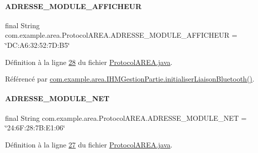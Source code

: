 \paragraph{\texorpdfstring{A\+D\+R\+E\+S\+S\+E\+\_\+\+M\+O\+D\+U\+L\+E\+\_\+\+A\+F\+F\+I\+C\+H\+E\+UR}{ADRESSE\_MODULE\_AFFICHEUR}}
{\footnotesize\ttfamily final String com.\+example.\+area.\+Protocol\+A\+R\+E\+A.\+A\+D\+R\+E\+S\+S\+E\+\_\+\+M\+O\+D\+U\+L\+E\+\_\+\+A\+F\+F\+I\+C\+H\+E\+UR = \char`\"{}D\+C\+:\+A6\+:32\+:52\+:7\+D\+:\+B5\char`\"{}\hspace{0.3cm}{\ttfamily [static]}}



Définition à la ligne \hyperlink{_protocol_a_r_e_a_8java_source_l00028}{28} du fichier \hyperlink{_protocol_a_r_e_a_8java_source}{Protocol\+A\+R\+E\+A.\+java}.



Référencé par \hyperlink{_i_h_m_gestion_partie_8java_source_l00329}{com.\+example.\+area.\+I\+H\+M\+Gestion\+Partie.\+initialiser\+Liaison\+Bluetooth()}.

\mbox{\label{classcom_1_1example_1_1area_1_1_protocol_a_r_e_a_a57f9d1bae3c42517827ff0f193f0f36f}} 
\paragraph{\texorpdfstring{A\+D\+R\+E\+S\+S\+E\+\_\+\+M\+O\+D\+U\+L\+E\+\_\+\+N\+ET}{ADRESSE\_MODULE\_NET}}
{\footnotesize\ttfamily final String com.\+example.\+area.\+Protocol\+A\+R\+E\+A.\+A\+D\+R\+E\+S\+S\+E\+\_\+\+M\+O\+D\+U\+L\+E\+\_\+\+N\+ET = \char`\"{}24\+:6\+F\+:28\+:7\+B\+:\+E1\+:06\char`\"{}\hspace{0.3cm}{\ttfamily [static]}}



Définition à la ligne \hyperlink{_protocol_a_r_e_a_8java_source_l00027}{27} du fichier \hyperlink{_protocol_a_r_e_a_8java_source}{Protocol\+A\+R\+E\+A.\+java}.



